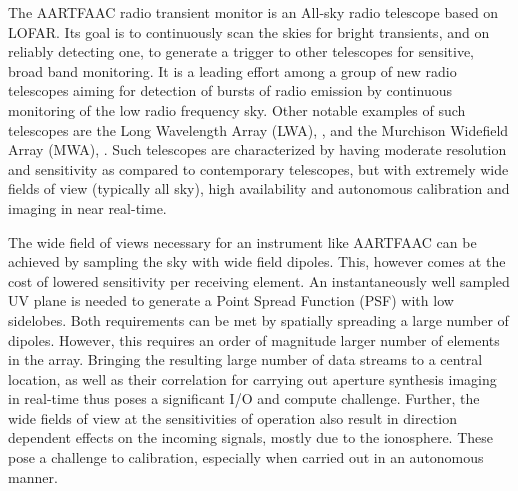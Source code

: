 \documentclass{ws-jai}
\begin{document}


The AARTFAAC  radio transient  monitor is  an All-sky  radio telescope  based on
LOFAR. Its goal is to continuously scan  the skies for bright transients, and on
reliably detecting one, to generate a trigger to other telescopes for sensitive,
broad  band monitoring.   It is  a leading  effort among  a group  of new  radio
telescopes  aiming for  detection  of  bursts of  radio  emission by  continuous
monitoring  of the  low  radio frequency  sky. Other  notable  examples of  such
telescopes are  the Long Wavelength  Array (LWA), \cite{ellingsonLWA1},  and the
Murchison Widefield  Array (MWA), \cite {tingay2013murchison}.   Such telescopes
are characterized by  having moderate resolution and sensitivity  as compared to
contemporary telescopes, but  with extremely wide fields of  view (typically all
sky),  high  availability  and  autonomous calibration  and  imaging  in  near
real-time.

The  wide field  of  views necessary  for  an instrument  like  AARTFAAC can  be
achieved by sampling the sky with wide field dipoles. This, however comes at the
cost  of lowered  sensitivity per  receiving element.   An instantaneously  well
sampled UV plane  is needed to generate  a Point Spread Function  (PSF) with low
sidelobes.  Both requirements  can be met by spatially spreading  a large number
of dipoles.  However, this requires  an  order of  magnitude  larger  number  of
elements in the array.  Bringing the resulting large number of data streams to a
central  location,  as well  as  their  correlation  for carrying  out  aperture
synthesis  imaging  in  real-time  thus  poses a  significant  I/O  and  compute
challenge. Further,  the wide fields of  view at the sensitivities  of operation
also result in  direction dependent effects on the incoming  signals, mostly due
to  the ionosphere.  These  pose  a challenge  to  calibration, especially  when
carried out in an autonomous manner.
\end{document}
